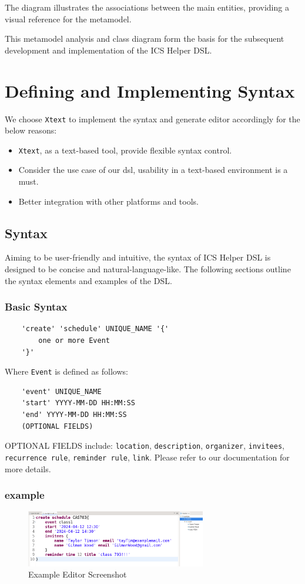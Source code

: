 \documentclass[12pt, letterpaper, twoside]{article}
\begin{document}
The diagram illustrates the associations between the main entities, providing a visual reference for the metamodel.

This metamodel analysis and class diagram form the basis for the subsequent development and implementation of the ICS Helper DSL.


\newpage
\section{Defining and Implementing Syntax}
We choose \texttt{Xtext} to implement the syntax and generate editor accordingly for the below reasons:

\begin{itemize}
    \item \texttt{Xtext}, as a text-based tool, provide flexible syntax control.
    \item Consider the use case of our dsl, usability in a text-based environment is a must.
    \item Better integration with other platforms and tools.
\end{itemize}

\subsection{Syntax}
Aiming to be user-friendly and intuitive, the syntax of ICS Helper DSL is designed to be concise and natural-language-like. 
The following sections outline the syntax elements and examples of the DSL.
\subsubsection{Basic Syntax}
\begin{verbatim}
    'create' 'schedule' UNIQUE_NAME '{'
        one or more Event
    '}'
\end{verbatim}

Where \texttt{Event} is defined as follows:

\begin{verbatim}
    'event' UNIQUE_NAME
    'start' YYYY-MM-DD HH:MM:SS
    'end' YYYY-MM-DD HH:MM:SS
    (OPTIONAL FIELDS)
\end{verbatim}
OPTIONAL FIELDS include: \texttt{location}, \texttt{description}, \texttt{organizer}, \texttt{invitees}, \texttt{recurrence rule}, \texttt{reminder rule}, \texttt{link}. 
Please refer to our documentation for more details.

\subsubsection{example}
\begin{figure}[H]
    \centering
    \includegraphics[width=0.7\textwidth]{editor_example.png}
    \caption{Example Editor Screenshot}
    \label{fig:class-diagram}
\end{figure}
\end{document}
